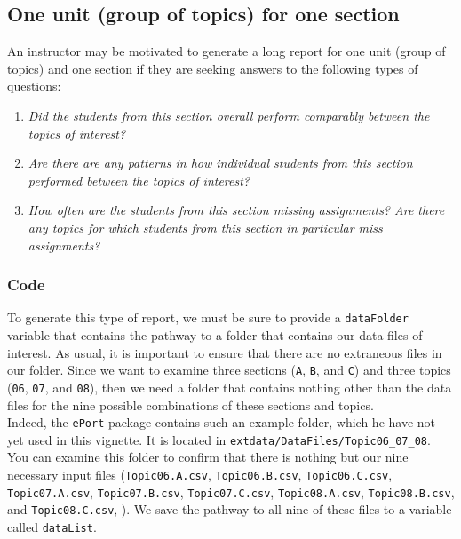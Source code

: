 \documentclass{article}\usepackage[]{graphicx}\usepackage[]{color}
\numberwithin{equation}{section} %
\begin{document}
\subsection{One unit (group of topics) for one section}

An instructor may be motivated to generate a long report for one unit (group of topics) and one section if they are seeking answers to the following types of questions:

\begin{enumerate}
\item \textit{Did the students from this section overall perform comparably between the topics of interest?}
\item \textit{Are there are any patterns in how individual students from this section performed between the topics of interest?}
\item \textit{How often are the students from this section missing assignments? Are there any topics for which students from this section in particular miss assignments?}
\end{enumerate}

\subsubsection{Code}

To generate this type of report, we must be sure to provide a \texttt{dataFolder} variable that contains the pathway to a folder that contains our data files of interest. As usual, it is important to ensure that there are no extraneous files in our folder. Since we want to examine three sections (\texttt{A}, \texttt{B}, and \texttt{C}) and three topics (\texttt{06}, \texttt{07}, and \texttt{08}), then we need a folder that contains nothing other than the data files for the nine possible combinations of these sections and topics.\\

Indeed, the \texttt{ePort} package contains such an example folder, which he have not yet used in this vignette. It is located in \texttt{extdata/DataFiles/Topic06\_07\_08}. You can examine this folder to confirm that there is nothing but our nine necessary input files (\texttt{Topic06.A.csv}, \texttt{Topic06.B.csv}, \texttt{Topic06.C.csv}, \texttt{Topic07.A.csv}, \texttt{Topic07.B.csv}, \texttt{Topic07.C.csv}, \texttt{Topic08.A.csv}, \texttt{Topic08.B.csv}, and \texttt{Topic08.C.csv}, ). We save the pathway to all nine of these files to a variable called \texttt{dataList}.\\
\end{document}
